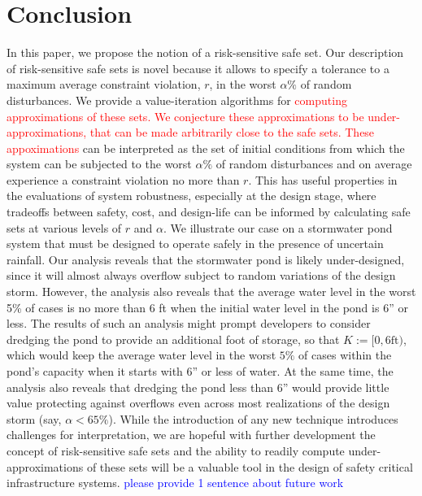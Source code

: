\documentclass[letterpaper, 10 pt, conference]{ieeeconf}  %
\begin{document}
\section{Conclusion}\label{conc}
In this paper, we propose the notion of a risk-sensitive safe set. Our description of risk-sensitive safe sets is novel because it allows to specify a tolerance to a maximum average constraint violation, $r$, in the worst $\alpha\%$ of random disturbances. We provide a value-iteration algorithms for \textcolor{red}{computing approximations of these sets. We conjecture these approximations to be under-approximations, that can be made arbitrarily close to the safe sets. These appoximations} can be interpreted as the set of initial conditions from which the system can be subjected to the worst $\alpha\%$ of random disturbances and on average experience a constraint violation no more than $r$. This has useful properties in the evaluations of system robustness, especially at the design stage, where tradeoffs between safety, cost, and design-life can be informed by calculating safe sets at various levels of $r$ and $\alpha$. We illustrate our case on a stormwater pond system that must be designed to operate safely in the presence of uncertain rainfall. Our analysis reveals that the stormwater pond is likely under-designed, since it will almost always overflow subject to random variations of the design storm. However, the analysis also reveals that the average water level in the worst 5\% of cases is no more than $6$ ft when the initial water level in the pond is $6$” or less. The results of such an analysis might prompt developers to consider dredging the pond to provide an additional foot of storage, so that $K :=[0,6\text{ft})$, which would keep the average water level in the worst $5\%$ of cases within the pond’s capacity when it starts with $6$” or less of water. At the same time, the analysis also reveals that dredging the pond less than 6” would provide little value protecting against overflows even across most realizations of the design storm (say, $\alpha < 65\%$). While the introduction of any new technique introduces challenges for interpretation, we are hopeful with further development the concept of risk-sensitive safe sets and the ability to readily compute under-approximations of these sets will be a valuable tool in the design of safety critical infrastructure systems. 
\textcolor{blue}{please provide 1 sentence about future work}

\end{document}

